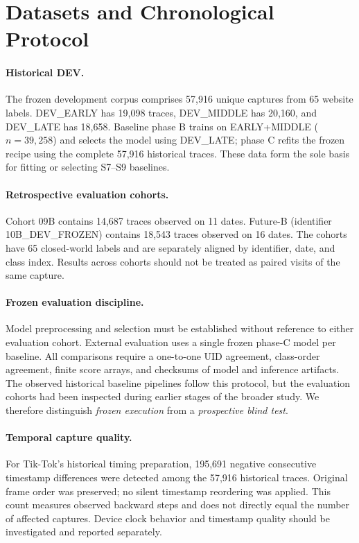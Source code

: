 \section{Datasets and Chronological Protocol}\label{sec:data}
\paragraph{Historical DEV.} The frozen development corpus comprises 57,916 unique captures from 65 website labels. DEV\_EARLY has 19,098 traces, DEV\_MIDDLE has 20,160, and DEV\_LATE has 18,658. Baseline phase B trains on EARLY+MIDDLE ($n=39,258$) and selects the model using DEV\_LATE; phase C refits the frozen recipe using the complete 57,916 historical traces. These data form the sole basis for fitting or selecting S7--S9 baselines.

\paragraph{Retrospective evaluation cohorts.} Cohort 09B contains 14,687 traces observed on 11 dates. Future-B (identifier 10B\_DEV\_FROZEN) contains 18,543 traces observed on 16 dates. The cohorts have 65 closed-world labels and are separately aligned by identifier, date, and class index. Results across cohorts should not be treated as paired visits of the same capture.



\paragraph{Frozen evaluation discipline.} Model preprocessing and selection must be established without reference to either evaluation cohort. External evaluation uses a single frozen phase-C model per baseline. All comparisons require a one-to-one UID agreement, class-order agreement, finite score arrays, and checksums of model and inference artifacts. The observed historical baseline pipelines follow this protocol, but the evaluation cohorts had been inspected during earlier stages of the broader study. We therefore distinguish \emph{frozen execution} from a \emph{prospective blind test}.

\paragraph{Temporal capture quality.} For Tik-Tok's historical timing preparation, 195,691 negative consecutive timestamp differences were detected among the 57,916 historical traces. Original frame order was preserved; no silent timestamp reordering was applied. This count measures observed backward steps and does not directly equal the number of affected captures. Device clock behavior and timestamp quality should be investigated and reported separately.


